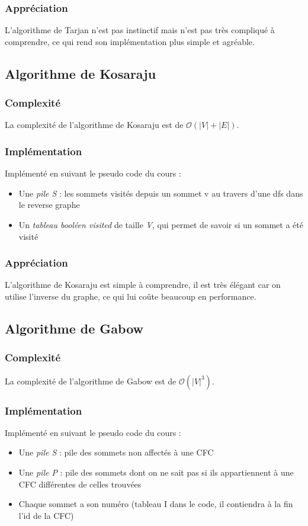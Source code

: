 \documentclass[11pt,a4paper]{article}
\begin{document}
\subsubsection{Appréciation}
L'algorithme de Tarjan n'est pas instinctif mais n'est pas très compliqué à comprendre, ce qui rend son implémentation plus simple et agréable.

\subsection{Algorithme de Kosaraju}

\subsubsection{Complexité}
La complexité de l'algorithme de Kosaraju est de $\mathcal{O}(|V|+|E|)$.

\subsubsection{Implémentation}
Implémenté en suivant le pseudo code du cours :
\begin{itemize}
\item Une \textit{pile S} : les sommets visités depuis un sommet v au travers d'une dfs dans le reverse graphe
\item Un \textit{tableau booléen visited} de taille \textit{V}, qui permet de savoir si un sommet a été visité
\end{itemize}


\subsubsection{Appréciation}
L'algorithme de Kosaraju est simple à comprendre, il est très élégant car on utilise l'inverse du graphe, ce qui lui coûte beaucoup en performance.

\pagebreak
\subsection{Algorithme de Gabow}

\subsubsection{Complexité}
La complexité de l'algorithme de Gabow est de $\mathcal{O}(|V|^3)$.

\subsubsection{Implémentation}
Implémenté en suivant le pseudo code du cours :
\begin{itemize}
\item Une \textit{pile S} : pile des sommets non affectés à une CFC
\item Une \textit{pile P} : pile des sommets dont on ne sait pas si ils appartiennent à une CFC différentes de celles trouvées
\item Chaque sommet a son numéro (tableau I dans le code, il contiendra à la fin l'id de la CFC)
\end{itemize}
\end{document}
